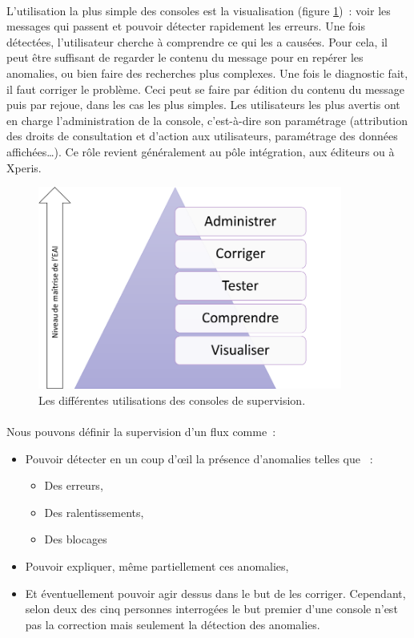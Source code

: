 			\paragraph{}
			L’utilisation la plus simple des consoles est la visualisation (figure
			\ref{usage_consoles})~: voir les messages qui passent et pouvoir détecter
			rapidement les erreurs. Une fois détectées, l’utilisateur cherche à
			comprendre ce qui les a causées. Pour cela, il peut être suffisant de
			regarder le contenu du message pour en repérer les anomalies, ou bien faire
			des recherches plus complexes.
			Une fois le diagnostic fait, il faut corriger le problème. Ceci peut se
			faire par édition du contenu du message puis par rejoue, dans les cas les
			plus simples.\newline
			Les utilisateurs les plus
			avertis ont en charge l’administration de la console, c’est-à-dire son
			paramétrage (attribution des droits de consultation et d’action aux
			utilisateurs, paramétrage des données affichées\ldots). Ce rôle revient
			généralement au pôle intégration, aux éditeurs ou à Xperis.
			\begin{figure}[H]
				\centering
				\includegraphics[width=10cm]{../img/usage_1.png}
				\caption{\label{usage_consoles} Les différentes utilisations des consoles
				de supervision.}
			\end{figure}
			
			\paragraph{}
			Nous pouvons définir la supervision d'un flux comme~:
			\begin{itemize}
			  \item Pouvoir détecter en un coup d’œil la présence d’anomalies telles que
			 ~:
			  	\begin{itemize}
			  	  \item Des erreurs,
			  	  \item Des ralentissements,
			  	  \item Des blocages
		  	    \end{itemize}
			  \item Pouvoir expliquer, même partiellement ces anomalies,
			  \item Et éventuellement pouvoir agir dessus dans le but de les corriger.
			  Cependant, selon deux des cinq personnes interrogées le but premier d'une
			  console n'est pas la correction mais seulement la détection des anomalies. 
			\end{itemize}
			
